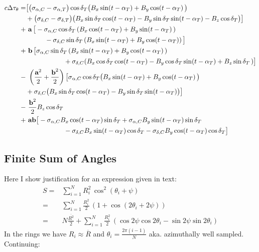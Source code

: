 	\begin{equation*}
		\begin{split}
			c\Delta\tau_\theta =& \big[\big(\sigma_{\alpha,C} - \sigma_{\alpha,T}\big)\cos\delta_T\big(B_x\sin(t-\alpha_T)+B_y\cos(t-\alpha_T)\,\big) \\
			&+\big(\sigma_{\delta,C} - \sigma_{\delta,T}\big)\big(B_x\sin\delta_T\cos(t-\alpha_T)-B_y\sin\delta_T\sin(t-\alpha_T)-B_z\cos\delta_T\big)\big] \\\vspace{0.5cm}
			+&~{\bf a}\, \big[-\sigma_{\alpha,C}\cos\delta_T \left(B_x \cos(t-\alpha_T)+B_y\sin(t-\alpha_T)\,\right) \\ 
			&\hspace{1cm}-\sigma_{\delta,C}\sin\delta_T\left(B_x\sin(t-\alpha_T)+ B_y\cos(t-\alpha_T)\right)\big] \\\vspace{1cm}
			+&~{\bf b}\, \big[\sigma_{\alpha,C}\sin\delta_T \left(B_x \sin(t-\alpha_T)+B_y\cos(t-\alpha_T)\,\right) \\ 
			&\hspace{2cm}+\sigma_{\delta,C}(B_x\cos\delta_T\cos(t-\alpha_T)- B_y\cos\delta_T\sin(t-\alpha_T)+B_z\sin\delta_T\,)\big] \\ 
			-&~\left(\frac{\textbf{a}^2}{2}+\frac{\textbf{b}^2}{2}\right)\big[\sigma_{\alpha,C}\cos\delta_T\big(B_x\sin(t-\alpha_T)+B_y\cos(t-\alpha_T)\,\big) \\
			&+\sigma_{\delta,C}\big(B_x\sin\delta_T\cos(t-\alpha_T)-B_y\sin\delta_T\sin(t-\alpha_T)\big)\big] \\
			-&~\frac{\textbf{b}^2}{2}B_z\cos\delta_T \\
			+&~\textbf{ab}\big[-\sigma_{\alpha,C}B_x\cos(t-\alpha_T)\sin\delta_T+\sigma_{\alpha,C}B_y\sin(t-\alpha_T)\sin\delta_T\\
			&\hspace{2cm}-\sigma_{\delta,C}B_x\sin(t-\alpha_T)\cos\delta_T - \sigma_{\delta,C}B_y\cos(t-\alpha_T)\cos\delta_T\big]
		\end{split}
	\end{equation*}
    	

	\subsection{Finite Sum of Angles}\label{app:additionalequationsC} Here I show justification for an expression given in text:
		\begin{align*}
			S =& \sum_{i=1}^{N}R_i^2\,\cos^2\left(\theta_i+\psi\right) \\
			=& \sum_{i=1}^{N}\frac{R_i^2}{2}\,\left(1 + \cos\left(2\theta_i + 2\psi\right)\right) \\
			=& N\frac{\overline{R^2}}{2} + \sum_{i=1}^{N}\frac{R_i^2}{2}\,\left(\cos 2\psi\cos 2\theta_i - \sin 2\psi\sin 2\theta_i\right)
			\end{align*} In the rings we have $R_i\approx\overline{R}$ and $\theta_i=\frac{2\pi\left(i-1\right)}{N}$ aka. azimuthally well sampled. Continuing:
	
